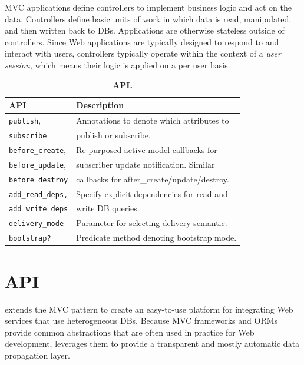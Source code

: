 MVC applications define controllers to implement business logic and
act on the data.  Controllers define basic units of work in which data
is read, manipulated, and then written back to DBs.  Applications are
otherwise stateless outside of controllers.  Since Web applications
are typically designed to respond to and interact with users,
controllers typically operate within the context of a 
{\em user session}, which means their logic is applied on a per user
basis. 

\begin{table}[t]
 \centering
 \begin{tabular}{l l}
 \toprule {\bf API}                          & {\bf Description}                           \\ \midrule
 {\tt {publish}},            & Annotations to denote which attributes to   \\
 {\tt {subscribe}}           & publish or subscribe.                       \\ \midrule
 {\tt {before\_create}},     & Re-purposed active model callbacks for      \\
 {\tt {before\_update}},     & subscriber update notification. Similar     \\
 {\tt {before\_destroy}}     & callbacks for after\_create/update/destroy. \\ \midrule
 {\tt {add\_read\_deps,}}    & Specify explicit dependencies for read and  \\
 {\tt {add\_write\_deps}}    & write DB queries.                           \\ \midrule
 {\tt {delivery\_mode}}      & Parameter for selecting delivery semantic.  \\ \midrule
 {\tt {bootstrap?}}          & Predicate method denoting bootstrap mode.   \\
 \bottomrule
 \end{tabular}
 \caption{{\bf \synapse API.}}
 \label{synapse:tab:api}
\end{table}

\section{\synapse API}
\label{synapse:sec:programming-model}

\synapse extends the MVC pattern to create an
easy-to-use platform for integrating Web services that use
heterogeneous DBs.  
Because MVC frameworks and ORMs provide common abstractions that are
often used in practice for Web development, \synapse
leverages them to provide a transparent and mostly automatic data
propagation layer.

